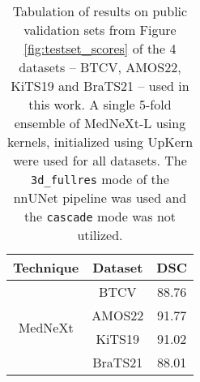 \documentclass[runningheads]{llncs}
\begin{document}
\begin{table}[]
    \centering
    \begin{tabular}{c|c|c}
        Technique & Dataset & DSC \\ \hline
        \multirow{4}{*}{MedNeXt} & BTCV & 88.76 \\ 
        & AMOS22 & 91.77 \\ 
        & KiTS19 & 91.02 \\ 
        & BraTS21 & 88.01 \\ \hline
    \end{tabular}
    \caption{Tabulation of results on public validation sets from Figure \ref{fig:testset_scores} of the 4 datasets -- BTCV, AMOS22, KiTS19 and BraTS21 -- used in this work. A single 5-fold ensemble of MedNeXt-L using  kernels, initialized using UpKern were used for all datasets. The \texttt{3d\_fullres} mode of the nnUNet pipeline was used and the \texttt{cascade} mode was not utilized.}
    \label{tab:my_label}
\end{table}
\end{document}
